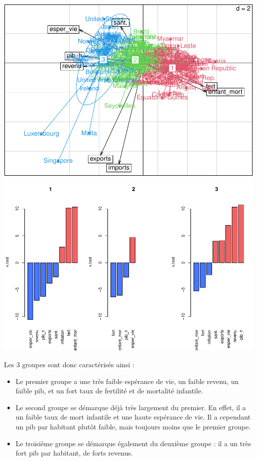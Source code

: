 \documentclass[
]{article}
\begin{document}
\includegraphics{Projet_files/figure-latex/unnamed-chunk-25-1.pdf}
\includegraphics{Projet_files/figure-latex/unnamed-chunk-25-2.pdf}

Les 3 groupes sont donc caractérisés ainsi :

\begin{itemize}
\item
  Le premier groupe a une très faible espérance de vie, un faible
  revenu, un faible pib, et un fort taux de fertilité et de mortalité
  infantile.
\item
  Le second groupe se démarque déjà très largement du premier. En effet,
  il a un faible taux de mort infantile et une haute espérance de vie.
  Il a cependant un pib par habitant plutôt faible, mais toujours moins
  que le premier groupe.
\item
  Le troisième groupe se démarque également du deuxième groupe : il a un
  très fort pib par habitant, de forts revenus.
\end{itemize}
\end{document}

